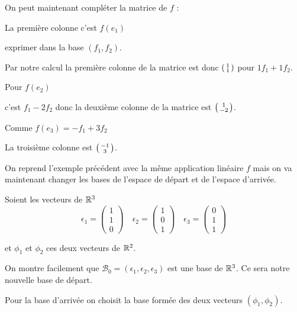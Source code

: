 \change
On peut maintenant compléter la matrice de $f$ :

\change
La première colonne c'est $f(e_1)$

\change
exprimer dans la base $(f_1,f_2)$.

\change
Par notre calcul la première colonne de la matrice 
    est donc $\left(\begin{smallmatrix}1\cr1\cr\end{smallmatrix}\right)$
    pour $1 f_1 + 1 f_2$.
    
\change
Pour $f(e_2)$ 

\change
c'est $f_1-2f_2$
donc la deuxième colonne de la matrice 
est $\left(\begin{smallmatrix}1\cr-2\cr\end{smallmatrix}\right)$.
    
\change
Comme $f(e_3) = -f_1+3f_2$


\change
La troisième colonne 
    est  $\left(\begin{smallmatrix}-1\cr3\cr\end{smallmatrix}\right)$.

\diapo

On reprend l'exemple précédent avec la même application linéaire $f$ mais on va maintenant changer les bases de l'espace de départ et de l'espace d'arrivée.

\change
Soient les vecteurs de $\mathbb{R} ^3$
$$\epsilon_1 = \begin{pmatrix}1\\1\\0\end{pmatrix} \quad
\epsilon_2 = \begin{pmatrix}1 \\ 0 \\ 1 \end{pmatrix} \quad
\epsilon_3 = \begin{pmatrix}0 \\ 1 \\ 1 \end{pmatrix}$$


\change
et $\phi_1$ et $\phi_2$  ces deux vecteurs de $\mathbb{R}^2$.

\change
On montre facilement que $\mathcal{B}_0 =(\epsilon_1,\epsilon_2,\epsilon_3)$ 
est une base de $\mathbb{R}^3$.
Ce sera notre nouvelle base de départ.

\change
Pour la base d'arrivée on choisit la base formée des deux vecteurs $(\phi_1,\phi_2)$.


